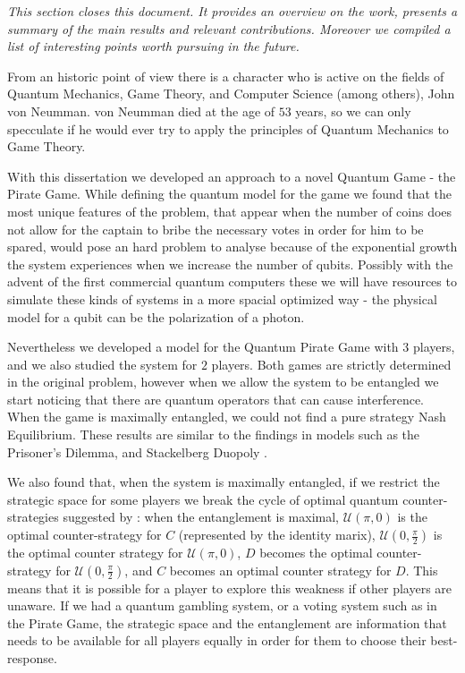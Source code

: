 \label{cap:conclusions}

\textit{This section closes this document. It provides an overview on the work, presents a summary of the main results and relevant contributions. Moreover we compiled a list of interesting points worth pursuing in the future.}

From an historic point of view there is a character who is active on the fields of Quantum Mechanics, Game Theory, and Computer Science (among others), John von Neumman. von Neumman died at the age of $53$ years, so we can only specculate if he would ever try to apply the principles of Quantum Mechanics to Game Theory. 




With this dissertation we developed an approach to a novel Quantum Game - the Pirate Game. While defining the quantum model for the game we found that the most unique features of the problem, that appear when the number of coins does not allow for the captain to bribe the necessary votes in order for him to be spared, would pose an hard problem to analyse because of the exponential growth the system experiences when we increase the number of qubits. Possibly with the advent of the first commercial quantum computers these we will have resources to simulate these kinds of systems in a more spacial optimized way - the physical model for a qubit can be the polarization of a photon. 

Nevertheless we developed a model for the Quantum Pirate Game with $3$ players, and we also studied the system for $2$ players. Both games are strictly determined in the original problem, however when we allow the system to be entangled we start noticing that  there are quantum operators that can cause interference. When the game is maximally entangled, we could not find a pure strategy Nash Equilibrium. These results are similar to the findings in models such as the Prisoner's Dilemma\cite{Eisert2008}\cite{Letters2002}, and Stackelberg Duopoly \cite{Khan2011}.

We also found that, when the system is maximally entangled, if we restrict the strategic space for some players we break the cycle of optimal quantum counter-strategies suggested by \cite{Du}: when the entanglement is maximal, $\mathcal{U}(\pi, 0)$ is the optimal counter-strategy for $C$ (represented by the identity marix), $\mathcal{U}(0, \frac{\pi}{2})$ is the optimal counter strategy for $\mathcal{U}(\pi, 0)$, $D$ becomes the optimal counter-strategy for $\mathcal{U}(0, \frac{\pi}{2})$, and $C$ becomes an optimal counter strategy for $D$. This means that it is possible for a player to explore this weakness if other players are unaware. If we had a quantum gambling system, or a voting system such as in the Pirate Game, the strategic space and the entanglement are information that needs to be available for all players equally in order for them to choose their best-response.

